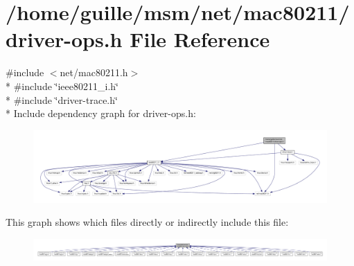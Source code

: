 \hypertarget{driver-ops_8h}{\section{/home/guille/msm/net/mac80211/driver-\/ops.h File Reference}
\label{driver-ops_8h}
}
{\ttfamily \#include $<$net/mac80211.\-h$>$}\\*
{\ttfamily \#include \char`\"{}ieee80211\-\_\-i.\-h\char`\"{}}\\*
{\ttfamily \#include \char`\"{}driver-\/trace.\-h\char`\"{}}\\*
Include dependency graph for driver-\/ops.h\-:
\nopagebreak
\begin{figure}[H]
\begin{center}
\leavevmode
\includegraphics[width=350pt]{driver-ops_8h__incl}
\end{center}
\end{figure}
This graph shows which files directly or indirectly include this file\-:
\nopagebreak
\begin{figure}[H]
\begin{center}
\leavevmode
\includegraphics[width=350pt]{driver-ops_8h__dep__incl}
\end{center}
\end{figure}
